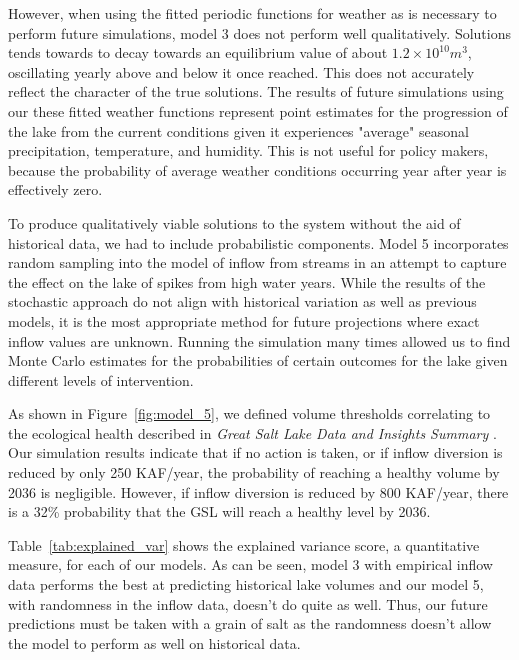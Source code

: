 \documentclass[12pt]{article}
\begin{document}
However, when using the fitted periodic functions for weather as is necessary to perform future simulations, model 3 does not perform well qualitatively. Solutions tends towards to decay towards an equilibrium value of about $1.2\times 10^{10} m^3$, oscillating yearly above and below it once reached. This does not accurately reflect the character of the true solutions. The results of future simulations using our these fitted weather functions represent point estimates for the progression of the lake from the current conditions given it experiences "average" seasonal precipitation, temperature, and humidity. This is not useful for policy makers, because the probability of average weather conditions occurring year after year is effectively zero. 

To produce qualitatively viable solutions to the system without the aid of historical data, we had to include probabilistic components. Model 5 incorporates random sampling into the model of inflow from streams in an attempt to capture the effect on the lake of spikes from high water years. While the results of the stochastic approach do not align with historical variation as well as previous models, it is the most appropriate method for future projections where exact inflow values are unknown. Running the simulation many times allowed us to find Monte Carlo estimates for the probabilities of certain outcomes for the lake given different levels of intervention.

As shown in Figure~\ref{fig:model_5}, we defined volume thresholds correlating to the ecological health described in \textit{Great Salt Lake Data and Insights Summary} \cite{GSLStrikeTeam2026}. Our simulation results indicate that if no action is taken, or if inflow diversion is reduced by only 250 KAF/year, the probability of reaching a healthy volume by 2036 is negligible. However, if inflow diversion is reduced by 800 KAF/year, there is a 32\% probability that the GSL will reach a healthy level by 2036. 

Table~\ref{tab:explained_var} shows the explained variance score, a quantitative measure, for each of our models. As can be seen, model 3 with empirical inflow data performs the best at predicting historical lake volumes and our model 5, with randomness in the inflow data, doesn’t do quite as well. Thus, our future predictions must be taken with a grain of salt as the randomness doesn’t allow the model to perform as well on historical data.
\end{document}
